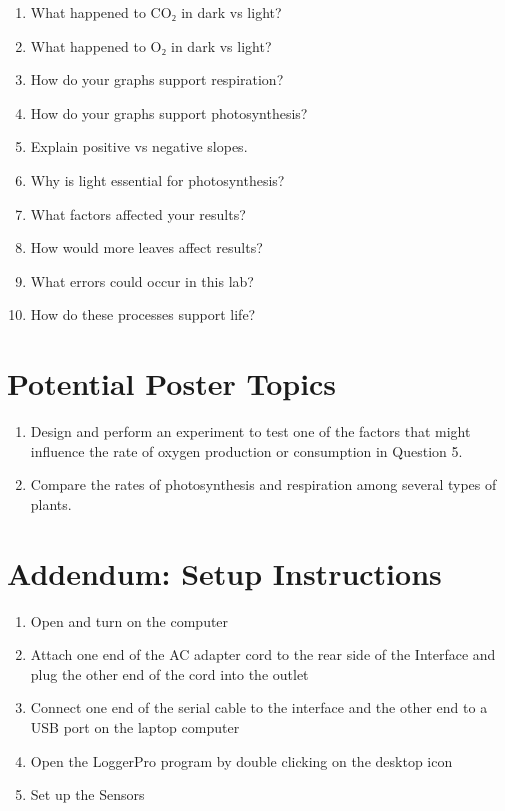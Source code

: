 \documentclass[
  letterpaper,
  DIV=11,
  numbers=noendperiod]{scrreprt}
\begin{document}
\begin{enumerate}
\def\labelenumi{\arabic{enumi}.}
\item
  What happened to CO₂ in dark vs light?
\item
  What happened to O₂ in dark vs light?
\item
  How do your graphs support respiration?
\item
  How do your graphs support photosynthesis?
\item
  Explain positive vs negative slopes.
\item
  Why is light essential for photosynthesis?
\item
  What factors affected your results?
\item
  How would more leaves affect results?
\item
  What errors could occur in this lab?
\item
  How do these processes support life?
\end{enumerate}

\section{\texorpdfstring{\textbf{Potential Poster
Topics}}{Potential Poster Topics}}\label{potential-poster-topics}

\begin{enumerate}
\def\labelenumi{\arabic{enumi}.}
\item
  Design and perform an experiment to test one of the factors that might
  influence the rate of oxygen production or consumption in Question 5.
\item
  Compare the rates of photosynthesis and respiration among several
  types of plants.
\end{enumerate}

\section{\texorpdfstring{\textbf{Addendum: Setup
Instructions}}{Addendum: Setup Instructions}}\label{addendum-setup-instructions}

\begin{enumerate}
\def\labelenumi{\arabic{enumi}.}
\item
  Open and turn on the computer
\item
  Attach one end of the AC adapter cord to the rear side of the
  Interface and plug the other end of the cord into the outlet
\item
  Connect one end of the serial cable to the interface and the other end
  to a USB port on the laptop computer
\item
  Open the LoggerPro program by double clicking on the desktop icon
\item
  Set up the Sensors
\end{enumerate}
\end{document}
